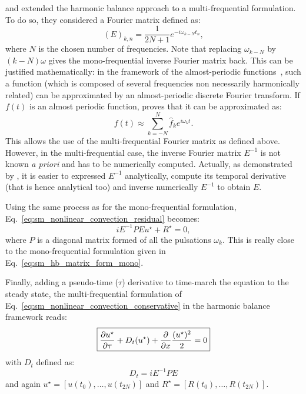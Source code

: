 \citet{Gopinath2007} and \citet{Ekici2007} 
extended the harmonic balance approach to
a multi-frequential formulation. To do so, they considered
a Fourier matrix defined as:
\begin{equation}
	(E)_{k,n} = \frac{1}{2N+1} e^{-i \omega_{k-N} t_n},
\end{equation}
where $N$ is the chosen number of frequencies.
Note that replacing $\omega_{k-N}$ by $(k - N) \omega$ gives
the mono-frequential inverse Fourier matrix back. 
This can be justified mathematically: in the
framework of the almost-periodic functions~\cite{Besicovitch1932},
such a function (which is composed of several
frequencies non necessarily harmonically related) can be approximated
by an almost-periodic
discrete Fourier transform. If $f(t)$ is an almost periodic function,
\citet{Besicovitch1932} proves that it can be approximated as:
\begin{equation}
	f(t) \approx \sum_{k=-N}^{N} \widehat{f}_k 
	e^{i \omega_k t}.
\end{equation}
This allows the use of the multi-frequential Fourier matrix as defined
above. However, in the multi-frequential case, the inverse Fourier matrix
$E^{-1}$ is not known \textit{a priori} 
and has to be numerically computed. Actually, as demonstrated by 
\citet{Gopinath2007}, it is easier to expressed $E^{-1}$ analytically,
compute its temporal derivative (that is hence analytical too) 
and inverse numerically $E^{-1}$ to obtain $E$.

Using the same process as for the mono-frequential formulation,
Eq.~\ref{eq:sm_nonlinear_convection_residual} becomes:
\begin{equation}
	i E^{-1} P E u^\star + R^\star = 0,
\end{equation}
where $P$ is a diagonal matrix formed of all the pulsations $\omega_k$.
This is really close to the mono-frequential formulation given
in Eq.~\ref{eq:sm_hb_matrix_form_mono}.

Finally, adding a pseudo-time ($\tau$) derivative 
to time-march the equation to the steady state,
the multi-frequential formulation of 
Eq.~\ref{eq:sm_nonlinear_convection_conservative} in the harmonic
balance framework reads:
\begin{equation}
	\fbox{$
	\displaystyle \frac{\partial u^\star}{\partial \tau} +
	D_t (u^\star) + 
	\displaystyle \frac{\partial}{\partial x}
		\frac{(u^\star)^2}{2} = 0
	$}
\end{equation}
with $D_t$ defined as:
\begin{equation}
	D_t = i E^{-1} P E
\end{equation}
and again $u^\star = [u(t_0), \ldots, u(t_{2N})]$ 
and $R^\star = [R(t_0), \ldots, R(t_{2N})]$.

